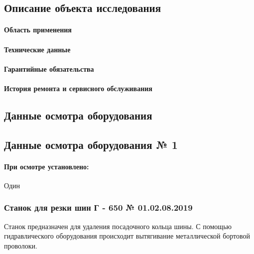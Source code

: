 \subsection{Описание объекта исследования}

\paragraph{Область применения}

\paragraph{Технические данные}

\paragraph{Гарантийные обязательства}

\paragraph{История ремонта и сервисного обслуживания}

\subsection{Данные осмотра оборудования}



\subsection{Данные осмотра оборудования № 1}


\paragraph{При  осмотре установлено:}

Один



\subsubsection{Станок для резки шин Г - 650 № 01.02.08.2019}

Станок предназначен для удаления посадочного кольца шины.
С помощью гидравлического оборудования происходит вытягивание металлической бортовой проволоки.


